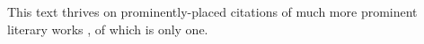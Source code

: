 This text thrives on prominently-placed citations \cite[e.\,g.,][]{Frank1957} of much more prominent literary works \cite[cf.][p. 7]{Orwell1957}, of which \cite{Hawking1988} is only one.

